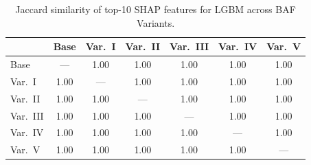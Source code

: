 \begin{table}[H]
\centering
\caption{Jaccard similarity of top-10 SHAP features for LGBM across BAF Variants.}
\label{tab:shap_stability}
\begin{tabular}{l c c c c c c}
\toprule
         & Base & Var.~I & Var.~II & Var.~III & Var.~IV & Var.~V \\
\midrule
Base       & --- & 1.00 & 1.00 & 1.00 & 1.00 & 1.00 \\
Var.~I     & 1.00 & --- & 1.00 & 1.00 & 1.00 & 1.00 \\
Var.~II    & 1.00 & 1.00 & --- & 1.00 & 1.00 & 1.00 \\
Var.~III   & 1.00 & 1.00 & 1.00 & --- & 1.00 & 1.00 \\
Var.~IV    & 1.00 & 1.00 & 1.00 & 1.00 & --- & 1.00 \\
Var.~V     & 1.00 & 1.00 & 1.00 & 1.00 & 1.00 & --- \\
\bottomrule
\end{tabular}
\end{table}